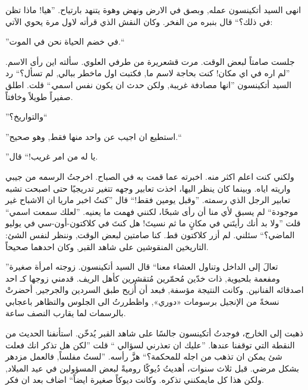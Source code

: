 \documentclass[12pt, a4paper]{article}
\begin{document}
\begin{otherlanguage}{arabic}
انهى السيد أتكينسون عمله, وبصق في الارض ونهض وهوة يتنهد بارتياح. ”هيا! ماذا تظن في ذلك؟“ قال بنبره من الفخر. وكان النقش
الذي قرأته لاول مرة يحوي الاَتي:



\begin{center}
\end{center}

\centerline{ ”في خضم الحياة نحن في الموت.“} 


جلست صامتاً لبعض الوقت. مرت قشعريرة من طرفي العلوي. سألته اين رأى الاسم. ”لم اره في اي مكان! كنت بحاجة لاسم ما, فكتبت اول ماخطر ببالي, 
لم تسأل؟“ رد السيد أتكينسون  ”انها مصادفة غريبة, ولكن حدث ان يكون نفس اسمي.“ قلت. اطلق صفيراً طويلاً وخافتاً.  \smallbreak

”والتواريخ؟“  

”استطيع ان اجيب عن واحد منها فقط, وهو صحيح.“  

”يا له من امر غريب!“  قال. \smallbreak

ولكني كنت اعلم اكثر منه. اخبرته عما قمت به في الصباح. اخرجتُ  الرسمه من جيبي واريته اياه. وبينما كان ينظر اليها، اخذت تعابير وجهه تتغير 
تدريجيًا حتى اصبحت تشبه تعابير الرجل الذي رسمته. ”وقبل يومين فقط!“ قال  ”كنتُ اخبر ماريا ان الاشباح غير موجودة“ 
لم يسبق لأي منا أن رأى شبحًا، لكنني فهمت ما يعنيه. ”لعلك سمعت اسمي“ قلت ”ولا بد أنك رأيتَني في مكانٍ ما ثم نسيتَ! هل كنتَ في 
كلاكتون-أون-سي في يوليو الماضي؟“ سئلني. لم أزر كلاكتون قط. كنا صامتين لبعض الوقت, وننظر لنفس الشئ: التاريخين المنقوشين على شاهد القبر,
وكان احدهما صحيحاً. \medbreak

”تعالَ إلى الداخل وتناول العشاء معنا“ قال  السيد أتكينسون. زوجته امرأة صغيرة ومفعمة بلحيوية,  ذات خدّين مُحمّرين مُتقشرين كأهل الريف.
قدمني زوجها كـ احد اصدقائه الفنانين. وكانت النتيجة مؤسفة,  فبعد أن أُزيح طبق السردين والجرجير, 
 أحضرتْ نسخةً من الإنجيل برسومات «دوري», واظطررتُ الى الجلوس والتظاهر باعجابي بالرسمات لما يقارب النصف ساعة. \medbreak


ذهبت  إلى الخارج، فوجدتُ أتكينسون جالسًا على شاهد القبر يُدخّن. استأنفنا الحديث من النقطة التي توقفنا عندها.
”عليك ان تعذرني لسؤالي “ قلت  ”لكن هل تذكر انك فعلت شئ يمكن ان تذهب من اجله للمحكمة؟“ هزَّ رأسه. 
”لستُ مفلساً, فالعمل مزدهر بشكل مرضي. قبل ثلاث سنوات، أهديتُ دُيوكًا روميةً لبعض المسؤولين في عيد الميلاد,
ولكن هذا كل مايمكنني تذكره. وكانت ديوكاً صغيرة ايضاً“ اضاف بعد ان فكر. \medbreak


\end{otherlanguage}
\end{document}
